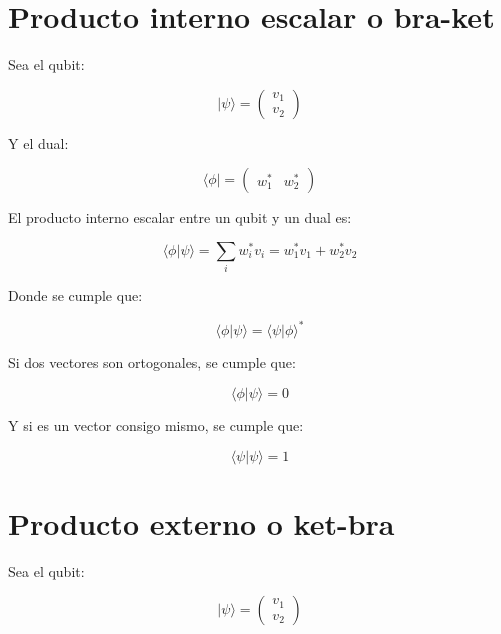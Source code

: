 \documentclass[11pt]{article}
\begin{document}
\section{Producto interno escalar o bra-ket}

Sea el qubit:

\begin{equation}
    |\psi\rangle = \begin{pmatrix} v_1 \\ v_2 \end{pmatrix}
\end{equation}

Y el dual:

\begin{equation}
    \langle \phi | = \begin{pmatrix} w_1^* & w_2^* \end{pmatrix}
\end{equation}

El producto interno escalar entre un qubit y un dual es:

\begin{equation}
    \langle \phi | \psi \rangle = \sum_{i} w_i^* v_i = w_1^* v_1 + w_2^* v_2
\end{equation}

Donde se cumple que:

\begin{equation}
    \langle \phi | \psi \rangle = \langle \psi | \phi \rangle^*
\end{equation}

Si dos vectores son ortogonales, se cumple que:

\begin{equation}
    \langle \phi | \psi \rangle = 0
\end{equation}

Y si es un vector consigo mismo, se cumple que:

\begin{equation}
    \langle \psi | \psi \rangle = 1
\end{equation}

\section{Producto externo o ket-bra}

Sea el qubit:

\begin{equation}
    |\psi\rangle = \begin{pmatrix} v_1 \\ v_2 \end{pmatrix}
\end{equation}
\end{document}
